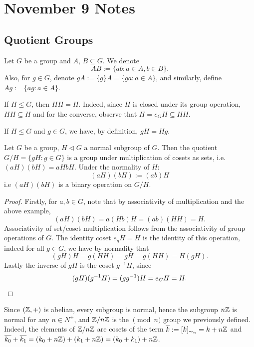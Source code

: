 \newpage 
\section{November 9 Notes}

\subsection{Quotient Groups}

Let $G$ be a group and $A$, $B \subseteq G$. We denote 
    \[ AB := \{ab : a \in A, b \in B \}. \]
Also, for $g \in G$, denote $gA := \{g\}A = \{ga : a \in A\}$, and similarly, define $Ag := \{ag : a \in A\}$. 

\begin{example}
    If $H \leq G$, then $HH = H$. Indeed, since $H$ is closed under its group operation, $HH \subseteq H$ and for the converse, observe that $H = e_GH \subseteq HH$. 
\end{example}

\begin{example}
    If $H \leq G$ and $g \in G$, we have, by definition, $gH = Hg$. 
\end{example}

\begin{propbox}
    Let $G$ be a group, $H \triangleleft G$ a normal subgroup of $G$. Then the quotient $G/H = \{gH : g \in G\}$ is a group under multiplication of cosets as sets, i.e. $(aH)(bH) = aHbH$. Under the normality of $H$:
    \[ (aH)(bH) := (ab)H \]
    i.e $(aH)(bH)$ is a binary operation on $G/H$. 
\end{propbox}

\begin{proof}
    Firstly, for $a, b \in G$, note that by associativity of multiplication and the above example,
    \[ (aH)(bH) = a(Hb)H = (ab)(HH) = H. \]
    Associativity of set/coset multiplication follows from the associativity of group operations of $G$. The identity coset $e_gH = H$ is the identity of this operation, indeed for all $g \in G$, we have by normality that
    \[ (gH)H = g(HH) = gH = g(HH) = H(gH). \]
    Lastly the inverse of $gH$ is the coset $g^{-1}H$, since
    \[ (gH)(g^{-1}H) = (gg^{-1})H = e_GH = H. \qedhere \] 
\end{proof}

\begin{example}
    Since $(\mathbb{Z}, +)$ is abelian, every subgroup is normal, hence the subgroup $n\mathbb{Z}$ is normal for any $n \in N^+$, and $\mathbb{Z}/n\mathbb{Z}$ is the $\pmod{n}$ group we previously defined. Indeed, the elements of $\mathbb{Z}/n\mathbb{Z}$ are cosets of the term $\overline{k} := [k]_{\sim_n} = k + n\mathbb{Z}$ and $\overline{k_0} + \overline{k_1} = (k_0 + n\mathbb{Z}) + (k_1 + n\mathbb{Z}) = (k_0 + k_1) + n\mathbb{Z}$. 
\end{example}

